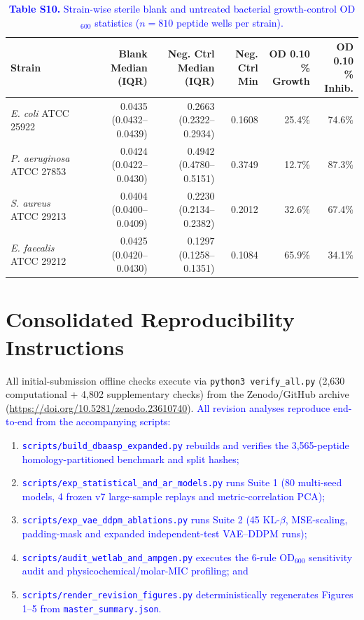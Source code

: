 \documentclass[11pt,a4paper]{article}
\newcommand{\rev}[1]{\textcolor{blue}{#1}}
\begin{document}
\begin{table}[H]
\centering\footnotesize\setlength{\tabcolsep}{4.0pt}
\caption*{\rev{\textbf{Table S10.} Strain-wise sterile blank and untreated bacterial growth-control OD$_{600}$ statistics ($n=810$ peptide wells per strain).}}
\begin{tabular}{lrrrrr}
\toprule
Strain & \shortstack[r]{Blank Median\\(IQR)} & \shortstack[r]{Neg. Ctrl Median\\(IQR)} & \shortstack[r]{Neg. Ctrl\\Min} & \shortstack[r]{OD 0.10\\\% Growth} & \shortstack[r]{OD 0.10\\\% Inhib.} \\
\midrule
\textit{E. coli} ATCC 25922 & 0.0435 (0.0432--0.0439) & 0.2663 (0.2322--0.2934) & 0.1608 & 25.4\% & 74.6\% \\
\textit{P. aeruginosa} ATCC 27853 & 0.0424 (0.0422--0.0430) & 0.4942 (0.4780--0.5151) & 0.3749 & 12.7\% & 87.3\% \\
\textit{S. aureus} ATCC 29213 & 0.0404 (0.0400--0.0409) & 0.2230 (0.2134--0.2382) & 0.2012 & 32.6\% & 67.4\% \\
\textit{E. faecalis} ATCC 29212 & 0.0425 (0.0420--0.0430) & 0.1297 (0.1258--0.1351) & 0.1084 & 65.9\% & 34.1\% \\
\bottomrule
\end{tabular}
\end{table}

\section*{Consolidated Reproducibility Instructions}
All initial-submission offline checks execute via {\small\texttt{python3 verify\_all.py}} (2,630 computational + 4,802 supplementary checks) from the Zenodo/GitHub archive (\url{https://doi.org/10.5281/zenodo.23610740}). \rev{All revision analyses reproduce end-to-end from the accompanying scripts:}
\begin{enumerate}[leftmargin=1.8em,itemsep=2pt]\raggedright
\item \rev{{\small\texttt{scripts/build\_dbaasp\_expanded.py}} rebuilds and verifies the 3,565-peptide homology-partitioned benchmark and split hashes;}
\item \rev{{\small\texttt{scripts/exp\_statistical\_and\_ar\_models.py}} runs Suite 1 (80 multi-seed models, 4 frozen v7 large-sample replays and metric-correlation PCA);}
\item \rev{{\small\texttt{scripts/exp\_vae\_ddpm\_ablations.py}} runs Suite 2 (45 KL-$\beta$, MSE-scaling, padding-mask and expanded independent-test VAE--DDPM runs);}
\item \rev{{\small\texttt{scripts/audit\_wetlab\_and\_ampgen.py}} executes the 6-rule OD$_{600}$ sensitivity audit and physicochemical/molar-MIC profiling; and}
\item \rev{{\small\texttt{scripts/render\_revision\_figures.py}} deterministically regenerates Figures 1--5 from {\small\texttt{master\_summary.json}}.}
\end{enumerate}
\end{document}
